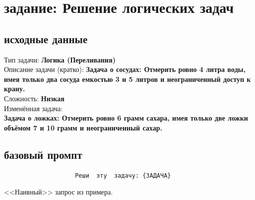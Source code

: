 \section{задание: Решение логических задач}
\subsection{исходные данные}
\indent Тип задачи: \textbf{Логика (Переливания)} \\
\indent Описание задачи (кратко): \textbf{Задача о сосудах: Отмерить ровно 4 литра воды, имея только два сосуда емкостью 3 и 5 литров и неограниченный доступ к крану.} \\
\indent Сложность: \textbf{Низкая} \\
\newline
\noindent Изменённая задача: \\
\indent \textbf{Задача о ложках: Отмерить ровно 6 грамм сахара, имея только две ложки объёмом 7 и 10 грамм и неограниченный сахар.} \\
\subsection{базовый промпт}
\begin{verbatim}
					Реши  эту  задачу: {ЗАДАЧА}
\end{verbatim}
<<Наивный>> запрос из примера.
